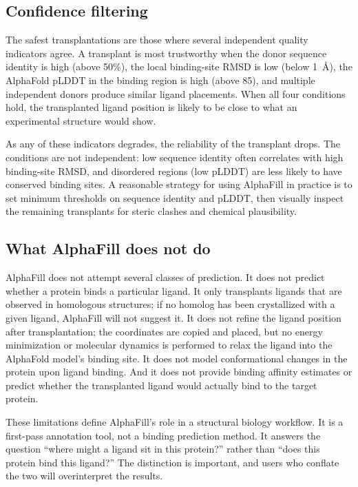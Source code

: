 \subsection{Confidence filtering}
\label{sec:confidence-filtering}

The safest transplantations are those where several independent quality indicators agree. A transplant is most trustworthy when the donor sequence identity is high (above 50\%), the local binding-site RMSD is low (below 1~\AA), the AlphaFold pLDDT in the binding region is high (above 85), and multiple independent donors produce similar ligand placements. When all four conditions hold, the transplanted ligand position is likely to be close to what an experimental structure would show.

As any of these indicators degrades, the reliability of the transplant drops. The conditions are not independent: low sequence identity often correlates with high binding-site RMSD, and disordered regions (low pLDDT) are less likely to have conserved binding sites. A reasonable strategy for using AlphaFill in practice is to set minimum thresholds on sequence identity and pLDDT, then visually inspect the remaining transplants for steric clashes and chemical plausibility.

\subsection{What AlphaFill does not do}
\label{sec:what-not}

AlphaFill does not attempt several classes of prediction. It does not predict whether a protein binds a particular ligand. It only transplants ligands that are observed in homologous structures; if no homolog has been crystallized with a given ligand, AlphaFill will not suggest it. It does not refine the ligand position after transplantation; the coordinates are copied and placed, but no energy minimization or molecular dynamics is performed to relax the ligand into the AlphaFold model's binding site. It does not model conformational changes in the protein upon ligand binding. And it does not provide binding affinity estimates or predict whether the transplanted ligand would actually bind to the target protein.

These limitations define AlphaFill's role in a structural biology workflow. It is a first-pass annotation tool, not a binding prediction method. It answers the question ``where might a ligand sit in this protein?'' rather than ``does this protein bind this ligand?'' The distinction is important, and users who conflate the two will overinterpret the results.


